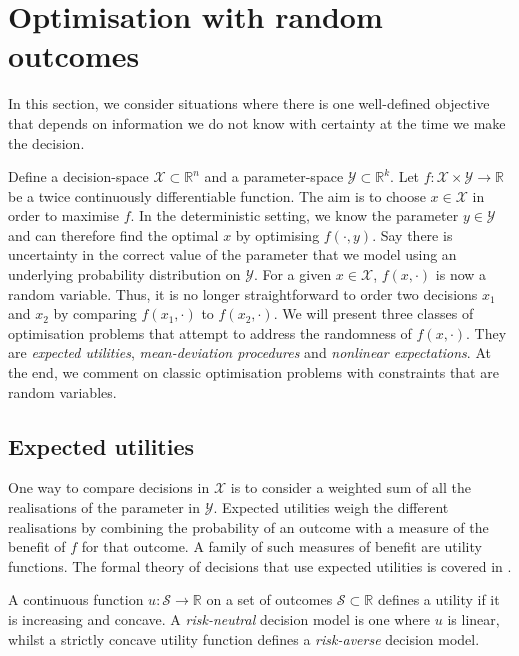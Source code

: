 \documentclass[main.tex]{subfiles}
\begin{document}
\section{Optimisation with random outcomes}\label{sec:one_optim_random_outcomes}
In this section, we consider situations where there is one
well-defined objective that depends on  information we do not know
with certainty at the time we make the decision.

Define a decision-space $\mathcal{X}\subset \mathbb{R}^n$ and a
parameter-space $\mathcal{Y}\subset \mathbb{R}^k$.
Let $f:\mathcal{X}\times\mathcal{Y}\to\mathbb{R}$ be a twice continuously
differentiable function.
The aim is to choose $x\in\mathcal{X}$ in order to maximise $f$.
In the deterministic setting, we know the parameter
$y\in\mathcal{Y}$ and can therefore find the optimal $x$ by optimising
$f(\cdot,y)$.
Say there is uncertainty in the correct value of the parameter that
we model using an underlying probability distribution on $\mathcal{Y}$.
For a given $x\in\mathcal{X}$, $f(x,\cdot)$ is now a random variable.
Thus, it is no longer straightforward to order two decisions $x_1$ and
$x_2$ by comparing $f(x_1,\cdot)$ to $f(x_2,\cdot)$.
We will present three classes of optimisation problems that attempt to
address the randomness of $f(x,\cdot)$. They are \emph{expected
  utilities}, \emph{mean-deviation procedures} and \emph{nonlinear
  expectations}.
At the end, we comment on classic optimisation problems with constraints
that are random variables.

\subsection{Expected utilities}
One way to compare decisions in $\mathcal{X}$ is to consider a weighted
sum of all the realisations of the parameter in $\mathcal{Y}$.
Expected utilities weigh the different realisations by combining the
probability of an outcome with a measure of the benefit of $f$ for that
outcome.
A family of such measures of benefit are utility functions. The formal
theory of decisions that use expected utilities is covered in
\citep[Ch.~2]{follmer2004stochastic}.
\begin{mydef}
  A continuous function $u:\mathcal{S}\to\mathbb{R}$ on a set of outcomes
  $\mathcal{S}\subset \mathbb{R}$ defines a utility if
  it is increasing and concave.
  A \emph{risk-neutral} decision
  model is one where $u$ is linear, whilst a strictly concave utility function defines a
  \emph{risk-averse} decision model.
\end{mydef}
\end{document}
